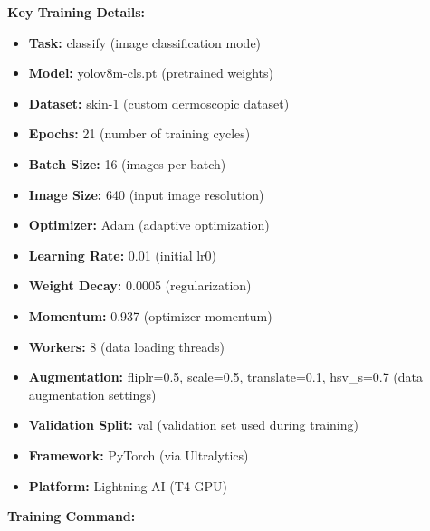 \documentclass[a4paper,12pt]{report}
\begin{document}
\begin{spacing}{1.5}
    \textbf{Key Training Details:}
    \begin{itemize}
        \item \textbf{Task:} classify (image classification mode)
        \item \textbf{Model:} yolov8m-cls.pt (pretrained weights)
        \item \textbf{Dataset:} skin-1 (custom dermoscopic dataset)
        \item \textbf{Epochs:} 21 (number of training cycles)
        \item \textbf{Batch Size:} 16 (images per batch)
        \item \textbf{Image Size:} 640 (input image resolution)
        \item \textbf{Optimizer:} Adam (adaptive optimization)
        \item \textbf{Learning Rate:} 0.01 (initial lr0)
        \item \textbf{Weight Decay:} 0.0005 (regularization)
        \item \textbf{Momentum:} 0.937 (optimizer momentum)
        \item \textbf{Workers:} 8 (data loading threads)
        \item \textbf{Augmentation:} fliplr=0.5, scale=0.5, translate=0.1, hsv\_s=0.7 (data augmentation settings)
        \item \textbf{Validation Split:} val (validation set used during training)
        \item \textbf{Framework:} PyTorch (via Ultralytics)
        \item \textbf{Platform:} Lightning AI (T4 GPU)
    \end{itemize}
    
    \textbf{Training Command:}

    





\end{spacing}
\end{document}
